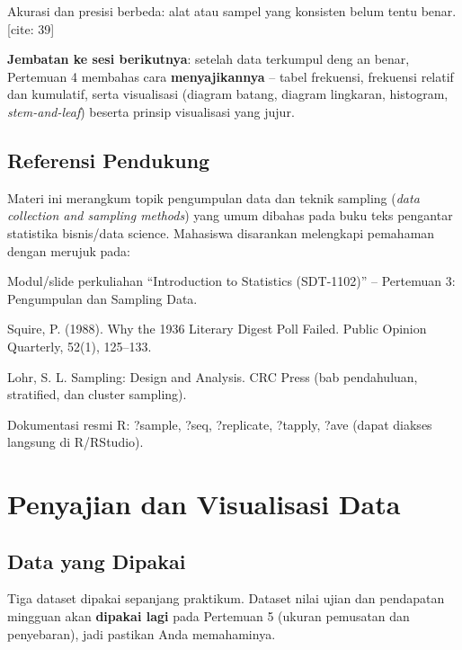 \documentclass[
  indonesian,
  letterpaper,
]{book}
\begin{document}
Akurasi dan presisi berbeda: alat atau sampel yang konsisten belum tentu
benar.{[}cite: 39{]}

\textbf{Jembatan ke sesi berikutnya}: setelah data terkumpul deng an
benar, Pertemuan 4 membahas cara \textbf{menyajikannya} -- tabel
frekuensi, frekuensi relatif dan kumulatif, serta visualisasi (diagram
batang, diagram lingkaran, histogram, \emph{stem-and-leaf}) beserta
prinsip visualisasi yang jujur.

\section{Referensi Pendukung}\label{referensi-pendukung-2}

Materi ini merangkum topik pengumpulan data dan teknik sampling
(\emph{data collection and sampling methods}) yang umum dibahas pada
buku teks pengantar statistika bisnis/data science. Mahasiswa disarankan
melengkapi pemahaman dengan merujuk pada:

Modul/slide perkuliahan ``Introduction to Statistics (SDT-1102)'' --
Pertemuan 3: Pengumpulan dan Sampling Data.

Squire, P. (1988). Why the 1936 Literary Digest Poll Failed. Public
Opinion Quarterly, 52(1), 125--133.

Lohr, S. L. Sampling: Design and Analysis. CRC Press (bab pendahuluan,
stratified, dan cluster sampling).

Dokumentasi resmi R: ?sample, ?seq, ?replicate, ?tapply, ?ave (dapat
diakses langsung di R/RStudio).


\chapter{Penyajian dan Visualisasi
Data}\label{penyajian-dan-visualisasi-data}

\section{Data yang Dipakai}\label{data-yang-dipakai}

Tiga dataset dipakai sepanjang praktikum. Dataset nilai ujian dan
pendapatan mingguan akan \textbf{dipakai lagi} pada Pertemuan 5 (ukuran
pemusatan dan penyebaran), jadi pastikan Anda memahaminya.
\end{document}
